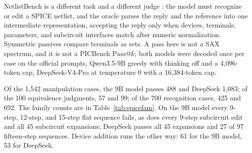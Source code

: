 \documentclass[11pt]{article}
\makeatletter
\newcommand{\passk}[1]{\mathrm{Pass@}#1}
\makeatother
\begin{document}
NetlistBench is a different task and a different judge \citep{ma2026netlistbench}: the model must recognize or edit a SPICE netlist, and the oracle parses the reply and the reference into one intermediate representation, accepting the reply only when devices, terminals, parameters, and subcircuit interfaces match after numeric normalization.
Symmetric passives compare terminals as sets.
A pass here is not a SAX spectrum, and it is not a PICBench $\passk{k}$; both models were decoded once per case on the official prompts, Qwen3.5-9B greedy with thinking off and a 4{,}096-token cap, DeepSeek-V4-Pro at temperature 0 with a 16{,}384-token cap.

Of the 1{,}542 manipulation cases, the 9B model passes 488 and DeepSeek 1{,}083; of the 100 equivalence judgments, 57 and 99; of the 700 recognition cases, 425 and 692.
The family counts are in Table~\ref{tab:spicefam}.
On the 9B model every 9-step, 12-step, and 15-step flat sequence fails, as does every 9-step subcircuit edit and all 45 subcircuit expansions; DeepSeek passes all 45 expansions and 27 of 97 fifteen-step sequences.
Device addition runs the other way: 61 for the 9B model, 53 for DeepSeek.
\end{document}
